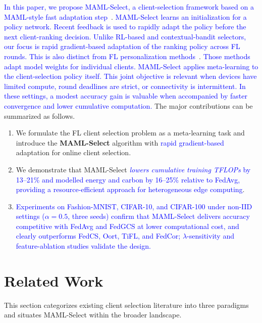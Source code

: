 \documentclass[journal]{IEEEtran}
\newcommand{\revision}[1]{\textcolor{blue}{#1}}
\begin{document}
\revision{In this paper, we propose MAML-Select, a client-selection framework based on a MAML-style fast adaptation step}~\cite{finn2017model}. \revision{MAML-Select learns an initialization for a policy network. Recent feedback is used to rapidly adapt the policy before the next client-ranking decision. Unlike RL-based and contextual-bandit selectors, our focus is rapid gradient-based adaptation of the ranking policy across FL rounds. This is also distinct from FL personalization methods}~\cite{fallah2020personalized}. \revision{Those methods adapt model weights for individual clients. MAML-Select applies meta-learning to the client-selection policy itself. This joint objective is relevant when devices have limited compute, round deadlines are strict, or connectivity is intermittent. In these settings, a modest accuracy gain is valuable when accompanied by faster convergence and lower cumulative computation.} The major contributions can be summarized as follows.
\begin{enumerate}
\setlength{\itemsep}{0pt}
\setlength{\topsep}{1pt}
		\item We formulate the FL client selection problem as a meta-learning task and introduce the \textbf{MAML-Select} algorithm with \revision{rapid gradient-based} adaptation for online client selection.
		\item We demonstrate that MAML-Select \revision{\textit{lowers cumulative training TFLOPs} by 13--21\% and modelled energy and carbon by 16--25\% relative to FedAvg, providing a resource-efficient approach for heterogeneous edge computing}.
	\item \revision{Experiments on Fashion-MNIST, CIFAR-10, and CIFAR-100 under non-IID settings ($\alpha = 0.5$, three seeds) confirm that MAML-Select delivers accuracy competitive with FedAvg and FedGCS at lower computational cost, and clearly outperforms FedCS, Oort, TiFL, and FedCor; $\lambda$-sensitivity and feature-ablation studies validate the design.}
\end{enumerate}

\section{Related Work}
This section categorizes existing client selection literature into three paradigms and situates MAML-Select within the broader landscape.
\end{document}
